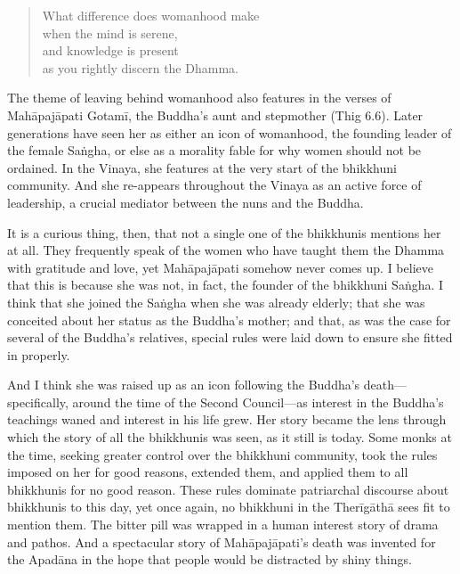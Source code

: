 \documentclass[12pt,openany]{book}%
\begin{document}
\begin{quotation}%
What difference does womanhood make \\
when the mind is serene, \\
and knowledge is present \\
as you rightly discern the Dhamma.

%
\end{quotation}

The theme of leaving behind womanhood also features in the verses of \textsanskrit{Mahāpajāpati} \textsanskrit{Gotamī}, the Buddha’s aunt and stepmother (Thig 6.6). Later generations have seen her as either an icon of womanhood, the founding leader of the female \textsanskrit{Saṅgha}, or else as a morality fable for why women should not be ordained. In the Vinaya, she features at the very start of the bhikkhuni community. And she re-appears throughout the Vinaya as an active force of leadership, a crucial mediator between the nuns and the Buddha.

It is a curious thing, then, that not a single one of the bhikkhunis mentions her at all. They frequently speak of the women who have taught them the Dhamma with gratitude and love, yet \textsanskrit{Mahāpajāpati} somehow never comes up. I believe that this is because she was not, in fact, the founder of the bhikkhuni \textsanskrit{Saṅgha}. I think that she joined the \textsanskrit{Saṅgha} when she was already elderly; that she was conceited about her status as the Buddha’s mother; and that, as was the case for several of the Buddha’s relatives, special rules were laid down to ensure she fitted in properly.

And I think she was raised up as an icon following the Buddha’s death—specifically, around the time of the Second Council—as interest in the Buddha’s teachings waned and interest in his life grew. Her story became the lens through which the story of all the bhikkhunis was seen, as it still is today. Some monks at the time, seeking greater control over the bhikkhuni community, took the rules imposed on her for good reasons, extended them, and applied them to all bhikkhunis for no good reason. These rules dominate patriarchal discourse about bhikkhunis to this day, yet once again, no bhikkhuni in the \textsanskrit{Therīgāthā} sees fit to mention them. The bitter pill was wrapped in a human interest story of drama and pathos. And a spectacular story of \textsanskrit{Mahāpajāpati}’s death was invented for the \textsanskrit{Apadāna} in the hope that people would be distracted by shiny things.
\end{document}
